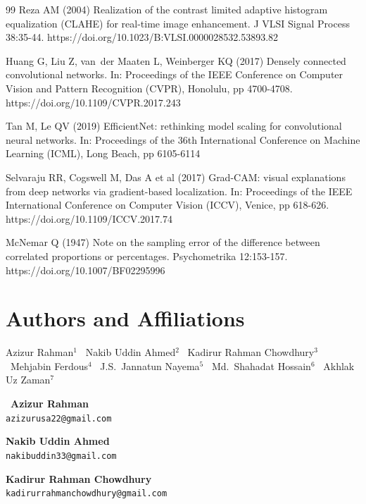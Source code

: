 \documentclass[11pt,a4paper]{article}
\begin{document}
\begin{thebibliography}{99}
Reza AM (2004) Realization of the contrast limited adaptive histogram
  equalization ({CLAHE}) for real-time image enhancement. J VLSI Signal
  Process 38:35-44.
  https://doi.org/10.1023/B:VLSI.0000028532.53893.82

Huang G, Liu Z, van~der Maaten L, Weinberger KQ (2017) Densely connected
  convolutional networks. In: Proceedings of the IEEE Conference on
  Computer Vision and Pattern Recognition (CVPR), Honolulu,
  pp 4700-4708. https://doi.org/10.1109/CVPR.2017.243

Tan M, Le QV (2019) {EfficientNet}: rethinking model scaling for
  convolutional neural networks. In: Proceedings of the 36th International
  Conference on Machine Learning (ICML), Long Beach, pp 6105-6114

Selvaraju RR, Cogswell M, Das A et al (2017) {Grad-CAM}: visual
  explanations from deep networks via gradient-based localization.
  In: Proceedings of the IEEE International Conference on Computer Vision
  (ICCV), Venice, pp 618-626.
  https://doi.org/10.1109/ICCV.2017.74

McNemar Q (1947) Note on the sampling error of the difference between
  correlated proportions or percentages. Psychometrika 12:153-157.
  https://doi.org/10.1007/BF02295996

\end{thebibliography}

\section*{Authors and Affiliations}

\noindent
Azizur Rahman$^{1}$ \textperiodcentered\ Nakib Uddin Ahmed$^{2}$ \textperiodcentered\
Kadirur Rahman Chowdhury$^{3}$ \textperiodcentered\ Mehjabin Ferdous$^{4}$ \textperiodcentered\
J.S.\ Jannatun Nayema$^{5}$ \textperiodcentered\ Md.\ Shahadat Hossain$^{6}$ \textperiodcentered\
Akhlak Uz Zaman$^{7}$

\bigskip
\noindent
\Letter\ \textbf{Azizur Rahman} \\
\texttt{azizurusa22@gmail.com}

\noindent
\textbf{Nakib Uddin Ahmed} \\
\texttt{nakibuddin33@gmail.com}

\noindent
\textbf{Kadirur Rahman Chowdhury} \\
\texttt{kadirurrahmanchowdhury@gmail.com}
\end{document}

